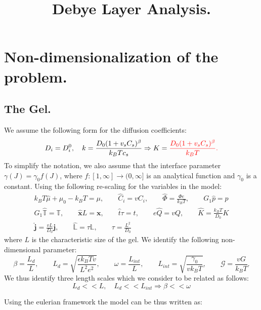 \documentclass[12pt]{extarticle}
\title{Debye Layer Analysis.}
\author{}
\newcommand{\LL}{\ensuremath{\mathbb{L}}}
\begin{document}
\section{Non-dimensionalization of the problem.}
\subsection{The Gel.}
We assume the following form for the diffusion coefficients:
\begin{equation}
D_i=D_i^0,\quad k = \frac{D_0(1+v_sC_s)^\beta}{k_B T c_s} \Rightarrow K=  \color{red}\frac{D_0(1+v_sC_s)^\beta}{k_B T}.
\end{equation}
To simplify the notation, we also assume that the interface parameter $\gamma(J)=\gamma_0 f(J)$, where $f:[1,\infty]\rightarrow(0,\infty]$ is an analytical function and $\gamma_0$ is a constant. 
Using the following re-scaling for the variables in the model:
\begin{equation*}
\begin{aligned}
k_BT\hat{\mu} + \mu_0 -k_BT= \mu, \qquad \hat{C}_i = vC_i, \qquad \hat{\Phi} = \frac{\Phi e}{k_B T}, \qquad  G_1\hat{p}= p\\
G_1\hat{\mathbb{T}}=\mathbb{T}, \qquad\hat{\mathbf{x}} L =\mathbf{x}, \qquad \hat{t}\tau=t, \qquad e\hat{Q} =v Q, \qquad \hat{K} = \frac{k_BT}{D_0}K\\
\hat{\mathbf{j}}=\frac{vL}{D_0}\mathbf{j}, \qquad \hat{\LL}= \tau \LL, \qquad \tau=\frac{L^2}{D_0}
\end{aligned}
\end{equation*}
where $L$ is the characteristic size of the gel. We identify the following non-dimensional parameter:
\begin{equation*}
\beta=\frac{L_d}{L}, \qquad L_d= \sqrt{\frac{\epsilon k_B Tv}{L^2e^2}}, \qquad \omega= \frac{L_{int}}{L}, \qquad L_{int}=\sqrt{\frac{\gamma_0}{vk_BT}}, \qquad \mathcal{G}=\frac{vG}{k_BT}.
\end{equation*}
We thus identify three length scales which we consider to be related as follows:
\begin{equation}
L_d<<L, \quad L_d<<L_{int} \Rightarrow \beta<<\omega
\end{equation}

Using the eulerian framework the model can be thus written as:
\end{document}
